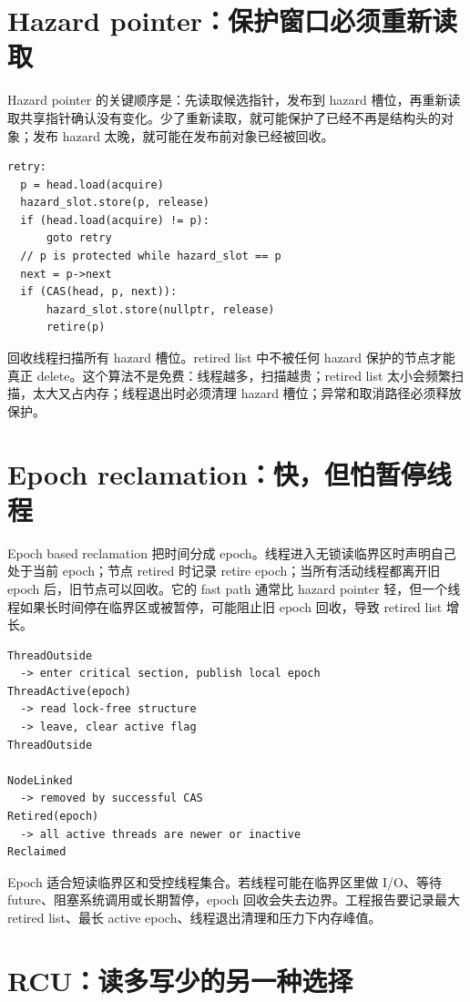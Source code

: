\section{Hazard pointer：保护窗口必须重新读取}

Hazard pointer 的关键顺序是：先读取候选指针，发布到 hazard 槽位，再重新读取共享指针确认没有变化。少了重新读取，就可能保护了已经不再是结构头的对象；发布 hazard 太晚，就可能在发布前对象已经被回收。

\begin{lstlisting}[numbers=none,caption={hazard pointer 的最小保护顺序}]
retry:
  p = head.load(acquire)
  hazard_slot.store(p, release)
  if (head.load(acquire) != p):
      goto retry
  // p is protected while hazard_slot == p
  next = p->next
  if (CAS(head, p, next)):
      hazard_slot.store(nullptr, release)
      retire(p)
\end{lstlisting}

回收线程扫描所有 hazard 槽位。retired list 中不被任何 hazard 保护的节点才能真正 delete。这个算法不是免费：线程越多，扫描越贵；retired list 太小会频繁扫描，太大又占内存；线程退出时必须清理 hazard 槽位；异常和取消路径必须释放保护。

\section{Epoch reclamation：快，但怕暂停线程}

Epoch based reclamation 把时间分成 epoch。线程进入无锁读临界区时声明自己处于当前 epoch；节点 retired 时记录 retire epoch；当所有活动线程都离开旧 epoch 后，旧节点可以回收。它的 fast path 通常比 hazard pointer 轻，但一个线程如果长时间停在临界区或被暂停，可能阻止旧 epoch 回收，导致 retired list 增长。

\begin{lstlisting}[numbers=none,caption={epoch 回收的状态机}]
ThreadOutside
  -> enter critical section, publish local epoch
ThreadActive(epoch)
  -> read lock-free structure
  -> leave, clear active flag
ThreadOutside

NodeLinked
  -> removed by successful CAS
Retired(epoch)
  -> all active threads are newer or inactive
Reclaimed
\end{lstlisting}

Epoch 适合短读临界区和受控线程集合。若线程可能在临界区里做 I/O、等待 future、阻塞系统调用或长期暂停，epoch 回收会失去边界。工程报告要记录最大 retired list、最长 active epoch、线程退出清理和压力下内存峰值。

\section{RCU：读多写少的另一种选择}

